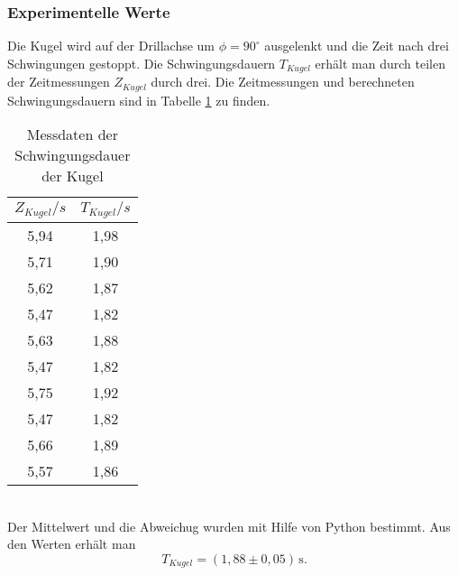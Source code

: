 \subsubsection{Experimentelle Werte}
Die Kugel wird auf der Drillachse um $\phi = 90^{\circ}$ ausgelenkt und die Zeit nach drei
Schwingungen gestoppt. Die Schwingungsdauern $T_{Kugel}$ erhält man durch teilen der Zeitmessungen
$Z_{Kugel}$ durch drei. Die Zeitmessungen und berechneten Schwingungsdauern sind in
Tabelle \ref{tab:T_Kugel} zu finden.
\begin{table}
  \centering
  \caption{Messdaten der Schwingungsdauer der Kugel}
  \label{tab:T_Kugel}
  \begin{tabular}{c c}
    \toprule
    $Z_{Kugel}/s$ & $T_{Kugel}/s$ \\
    \midrule
    5,94 & 1,98 \\
    5,71 & 1,90 \\
    5,62 & 1,87 \\
    5,47 & 1,82 \\
    5,63 & 1,88 \\
    5,47 & 1,82 \\
    5,75 & 1,92 \\
    5,47 & 1,82 \\
    5,66 & 1,89 \\
    5,57 & 1,86 \\
    \bottomrule
  \end{tabular}
\end{table}
\\
Der Mittelwert und die Abweichug wurden mit Hilfe von Python bestimmt. Aus den Werten erhält man
\begin{equation}
  T_{Kugel} = (1{,}88 \pm 0{,}05)\, \mathrm{s} .
\end{equation}

